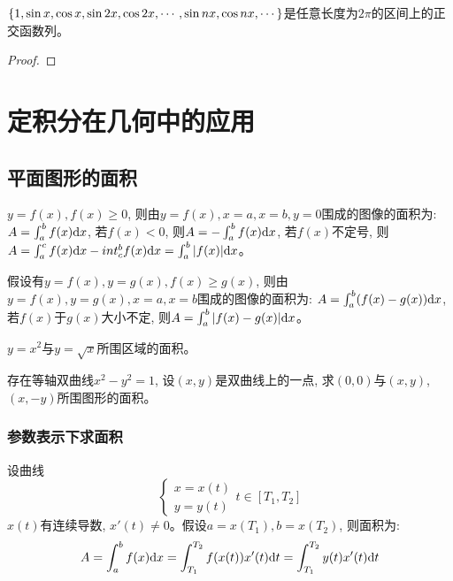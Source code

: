 \begin{theorem}
    $\left\{ 1, \sin x, \cos x, \sin 2x, \cos 2x, \cdots, \sin nx, \cos nx, \cdots\right\}$是任意长度为$2\pi$的区间上的正交函数列。
\end{theorem}
\begin{proof}
    
\end{proof}

\section{定积分在几何中的应用}
\subsection{平面图形的面积}
$y = f(x), f(x) \ge 0$, 则由$y=f(x), x=a, x=b, y=0$围成的图像的面积为: $A=\int_a^b f(x)\mathrm{d} x$, 若$f(x) < 0$, 则$A = -\int_a^b f(x)\mathrm{d} x$, 若$f(x)$不定号, 则$A=\int_a^c f(x)\mathrm{d} x - int_c^b f(x)\mathrm{d} x = \int_a^b |f(x)| \mathrm{d} x$。

假设有$y = f(x), y = g(x), f(x) \ge g(x)$, 则由$y=f(x), y=g(x), x=a, x=b$围成的图像的面积为: $A = \int_a^b (f(x)-g(x)) \mathrm{d} x$, 若$f(x)$于$g(x)$大小不定, 则$A = \int_a^b|f(x)-g(x)|\mathrm{d} x$。

\begin{example}
    $y = x^2$与$y = \sqrt{x}$所围区域的面积。
\end{example}
\begin{solution}
    
\end{solution}

\begin{example}
    存在等轴双曲线$x^2-y^2 = 1$, 设$(x, y)$是双曲线上的一点, 求$(0, 0)$与$(x, y)$, $(x, -y)$所围图形的面积。
\end{example}
\begin{solution}
    
\end{solution}

\subsubsection{参数表示下求面积}
设曲线
\begin{equation*}
    \begin{cases}
        x = x(t) \\
        y = y(t)
    \end{cases}
    t \in [T_1, T_2]
\end{equation*}
$x(t)$有连续导数, $x'(t) \neq 0$。假设$a = x(T_1), b = x(T_2)$, 则面积为:
\begin{equation*}
    A = \int_a^b f(x) \mathrm{d} x = \int_{T_1}^{T_2} f(x(t))x'(t) \mathrm{d} t = \int_{T_1}^{T_2} y(t) x'(t) \mathrm{d} t
\end{equation*}

